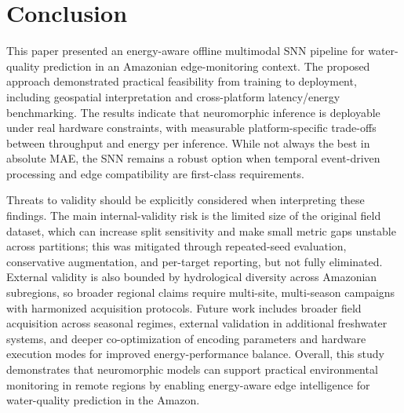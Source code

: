 \section{Conclusion}

This paper presented an energy-aware offline multimodal SNN pipeline for water-quality prediction in an Amazonian edge-monitoring context. The proposed approach demonstrated practical feasibility from training to deployment, including geospatial interpretation and cross-platform latency/energy benchmarking. The results indicate that neuromorphic inference is deployable under real hardware constraints, with measurable platform-specific trade-offs between throughput and energy per inference. While not always the best in absolute MAE, the SNN remains a robust option when temporal event-driven processing and edge compatibility are first-class requirements.

Threats to validity should be explicitly considered when interpreting these findings. The main internal-validity risk is the limited size of the original field dataset, which can increase split sensitivity and make small metric gaps unstable across partitions; this was mitigated through repeated-seed evaluation, conservative augmentation, and per-target reporting, but not fully eliminated. External validity is also bounded by hydrological diversity across Amazonian subregions, so broader regional claims require multi-site, multi-season campaigns with harmonized acquisition protocols. Future work includes broader field acquisition across seasonal regimes, external validation in additional freshwater systems, and deeper co-optimization of encoding parameters and hardware execution modes for improved energy-performance balance. Overall, this study demonstrates that neuromorphic models can support practical environmental monitoring in remote regions by enabling energy-aware edge intelligence for water-quality prediction in the Amazon.
